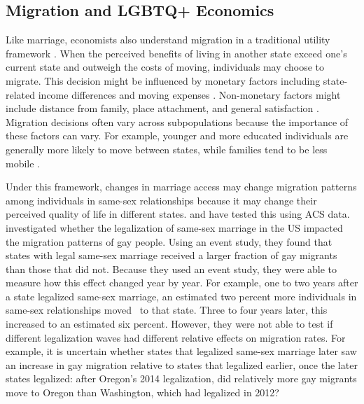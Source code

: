 \documentclass[12pt,letterpaper]{article}
\begin{document}
\subsection{Migration and LGBTQ+ Economics}
Like marriage, economists also understand migration in a traditional utility framework \citep{12}. When the perceived benefits of living in another state exceed one’s current state and outweigh the costs of moving, individuals may choose to migrate. This decision might be influenced by monetary factors including state-related income differences and moving expenses \citep{1, 15, 16, 17}. Non-monetary factors might include distance from family, place attachment, and general satisfaction \citep{1, 15}. Migration decisions often vary across subpopulations because the importance of these factors can vary. For example, younger and more educated individuals are generally more likely to move between states, while families tend to be less mobile \citep{16, 17}.

Under this framework, changes in marriage access may change migration patterns among individuals in same-sex relationships because it may change their perceived quality of life in different states. \citet{1} and \citet{12} have tested this using ACS data. \citet{1} investigated whether the legalization of same-sex marriage in the US impacted the migration patterns of gay people. Using an event study, they found that states with legal same-sex marriage received a larger fraction of gay migrants than those that did not. Because they used an event study, they were able to measure how this effect changed year by year. For example, one to two years after a state legalized same-sex marriage, an estimated two percent more individuals in same-sex relationships moved  to that state. Three to four years later, this increased to an estimated six percent. However, they were not able to test if different legalization waves had different relative effects on migration rates. For example, it is uncertain whether states that legalized same-sex marriage later saw an increase in gay migration relative to states that legalized earlier, once the later states legalized: after Oregon’s 2014 legalization, did relatively more gay migrants move to Oregon than Washington, which had legalized in 2012?
\end{document}
